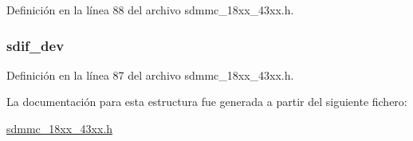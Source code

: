 Definición en la línea 88 del archivo sdmmc\+\_\+18xx\+\_\+43xx.\+h.

\subsubsection[{\texorpdfstring{sdif\+\_\+dev}{sdif_dev}}]{ sdif\+\_\+dev}\hypertarget{struct__mci__card__struct_a874100e24648dab78643d19778685b02}{}\label{struct__mci__card__struct_a874100e24648dab78643d19778685b02}


Definición en la línea 87 del archivo sdmmc\+\_\+18xx\+\_\+43xx.\+h.



La documentación para esta estructura fue generada a partir del siguiente fichero\+:\begin{DoxyCompactItemize}
\item 
\hyperlink{sdmmc__18xx__43xx_8h}{sdmmc\+\_\+18xx\+\_\+43xx.\+h}\end{DoxyCompactItemize}
